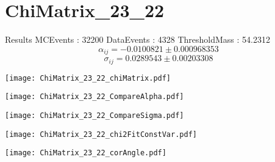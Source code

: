 \documentclass[a4paper,12pt]{article}
\begin{document}
\section{ChiMatrix\_23\_22}
\begin{minipage}{0.49\linewidth} Results \newline
MCEvents : 32200\newline
DataEvents : 4328 \newline
ThresholdMass : 54.2312\\
$$\alpha_{ij} = -0.0100821\pm 0.000968353$$
$$\sigma_{ij} = 0.0289543\pm 0.00203308$$
\end{minipage}\hfill
\begin{minipage}{0.49\linewidth} 
\texttt{[image: ChiMatrix\_23\_22\_chiMatrix.pdf]}\\
\end{minipage}
\hfill
\begin{minipage}{0.49\linewidth} 
\texttt{[image: ChiMatrix\_23\_22\_CompareAlpha.pdf]}\\
\end{minipage}
\hfill
\begin{minipage}{0.49\linewidth} 
\texttt{[image: ChiMatrix\_23\_22\_CompareSigma.pdf]}\\
\end{minipage}
\begin{minipage}{0.49\linewidth} 
\texttt{[image: ChiMatrix\_23\_22\_chi2FitConstVar.pdf]}\\
\end{minipage}
\hfill
\begin{minipage}{0.49\linewidth} 
\texttt{[image: ChiMatrix\_23\_22\_corAngle.pdf]}\\
\end{minipage}
\end{document}
